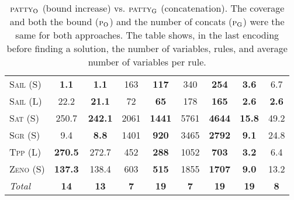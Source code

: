 \documentclass[11pt]{article}
\begin{document}
\begin{table}[tb]
{\begin{tabular}{|l||cc||cc||cc||cc||}
\textsc{Sail} (S)&\textbf{1.1}&\textbf{1.1}&163&\textbf{117}&340&\textbf{254}&\textbf{3.6}&{6.7}\\
\textsc{Sail} (L)&22.2&\textbf{21.1}&72&\textbf{65}&178&\textbf{165}&\textbf{2.6}&\textbf{2.6}\\
\textsc{Sat} (S)&250.7&\textbf{242.1}&2061&\textbf{1441}&5761&\textbf{4644}&\textbf{15.8}&{49.2}\\
\textsc{Sgr} (S)&9.4&\textbf{8.8}&1401&\textbf{920}&3465&\textbf{2792}&\textbf{9.1}&{24.8}\\
\textsc{Tpp} (L)&\textbf{270.5}&272.7&452&\textbf{288}&1052&\textbf{703}&\textbf{3.2}&{6.4}\\
\textsc{Zeno} (S)&\textbf{137.3}&138.4&603&\textbf{515}&1855&\textbf{1707}&\textbf{9.0}&{13.2}
\\\hline
\textit{Total}&\textbf{14}&\textbf{13}&\textbf{7}&\textbf{19}&\textbf{7}&\textbf{19}&\textbf{19}&\textbf{8}\\\hline

        \end{tabular}}
        \caption{$\textsc{patty}_\mathrm{O}$ (bound increase) vs. $\textsc{patty}_\mathrm{G}$ (concatenation). The coverage and both the bound ($\textsc{p}_\mathrm{O}$) and the number of concats ($\textsc{p}_\mathrm{G}$) were the same for both approaches. The table shows, in the last encoding before finding a solution, the number of variables, rules, and average number of variables per rule.}
        \label{tab:experiments}
        \end{table}
        
\end{document}
